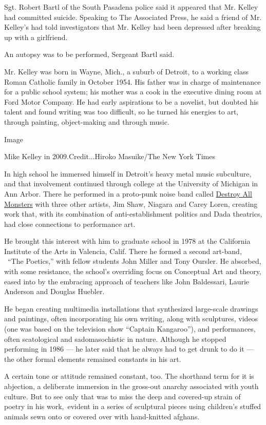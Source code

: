 Sgt. Robert Bartl of the South Pasadena police said it appeared that Mr.
Kelley had committed suicide. Speaking to The Associated Press, he said
a friend of Mr. Kelley's had told investigators that Mr. Kelley had been
depressed after breaking up with a girlfriend.

An autopsy was to be performed, Sergeant Bartl said.

Mr. Kelley was born in Wayne, Mich., a suburb of Detroit, to a working
class Roman Catholic family in October 1954. His father was in charge of
maintenance for a public school system; his mother was a cook in the
executive dining room at Ford Motor Company. He had early aspirations to
be a novelist, but doubted his talent and found writing was too
difficult, so he turned his energies to art, through painting,
object-making and through music.

Image

Mike Kelley in 2009.Credit...Hiroko Masuike/The New York Times

In high school he immersed himself in Detroit's heavy metal music
subculture, and that involvement continued through college at the
University of Michigan in Ann Arbor. There he performed in a proto-punk
noise band called
\href{http://en.wikipedia.org/wiki/Destroy_All_Monsters_\%28band\%29}{Destroy
All Monsters} with three other artists, Jim Shaw, Niagara and Carey
Loren, creating work that, with its combination of anti-establishment
politics and Dada theatrics, had close connections to performance art.

He brought this interest with him to graduate school in 1978 at the
California Institute of the Arts in Valencia, Calif. There he formed a
second art-band, ~``The Poetics,'' with fellow students John Miller and
Tony Oursler. He absorbed, with some resistance, the school's overriding
focus on Conceptual Art and theory, eased into by the embracing approach
of teachers like John Baldessari, Laurie Anderson and Douglas Huebler.

He began creating multimedia installations that synthesized large-scale
drawings and paintings, often incorporating his own writing, along with
sculptures, videos (one was based on the television show ``Captain
Kangaroo''), and performances, often scatological and sadomasochistic in
nature. Although he stopped performing in 1986 --- he later said that he
always had to get drunk to do it --- the other formal elements remained
constants in his art.

A certain tone or attitude remained constant, too. The shorthand term
for it is abjection, a deliberate immersion in the gross-out anarchy
associated with youth culture. But to see only that was to miss the deep
and covered-up strain of poetry in his work,~evident in a series of
sculptural pieces using children's stuffed animals sewn onto or covered
over with hand-knitted afghans.

